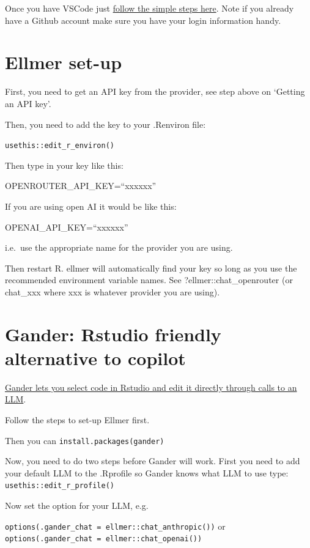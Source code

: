 \documentclass[
  letterpaper,
  DIV=11,
  numbers=noendperiod]{scrreprt}
\begin{document}
Once you have VSCode just
\href{https://docs.github.com/en/copilot/how-tos/manage-your-account/get-started-with-a-copilot-plan\#visual-studio-and-vs-code}{follow
the simple steps here}. Note if you already have a Github account make
sure you have your login information handy.

\section{Ellmer set-up}\label{sec-ellmer}

First, you need to get an API key from the provider, see step above on
`Getting an API key'.

Then, you need to add the key to your .Renviron file:

\texttt{usethis::edit\_r\_environ()}

Then type in your key like this:

OPENROUTER\_API\_KEY=``xxxxxx''

If you are using open AI it would be like this:

OPENAI\_API\_KEY=``xxxxxx''

i.e.~use the appropriate name for the provider you are using.

Then restart R. ellmer will automatically find your key so long as you
use the recommended environment variable names. See
?ellmer::chat\_openrouter (or chat\_xxx where xxx is whatever provider
you are using).

\section{Gander: Rstudio friendly alternative to
copilot}\label{sec-gander}

\href{https://simonpcouch.github.io/gander/articles/gander.html}{Gander
lets you select code in Rstudio and edit it directly through calls to an
LLM}.

Follow the steps to set-up Ellmer first.

Then you can \texttt{install.packages(gander)}

Now, you need to do two steps before Gander will work. First you need to
add your default LLM to the .Rprofile so Gander knows what LLM to use
type: \texttt{usethis::edit\_r\_profile()}

Now set the option for your LLM, e.g.~

\texttt{options(.gander\_chat\ =\ ellmer::chat\_anthropic())} or
\texttt{options(.gander\_chat\ =\ ellmer::chat\_openai())}
\end{document}
